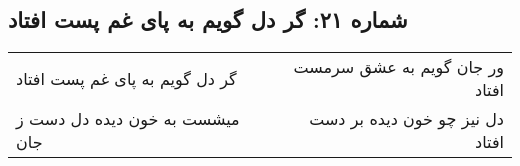 \begin{center}
\section*{شماره ۲۱: گر دل گویم به پای غم پست افتاد}
\label{sec:021}
\begin{longtable}{l p{0.5cm} r}
گر دل گویم به پای غم پست افتاد
&&
ور جان گویم به عشق سرمست افتاد
\\
میشست به خون دیده دل دست ز جان
&&
دل نیز چو خون دیده بر دست افتاد
\\
\end{longtable}
\end{center}
